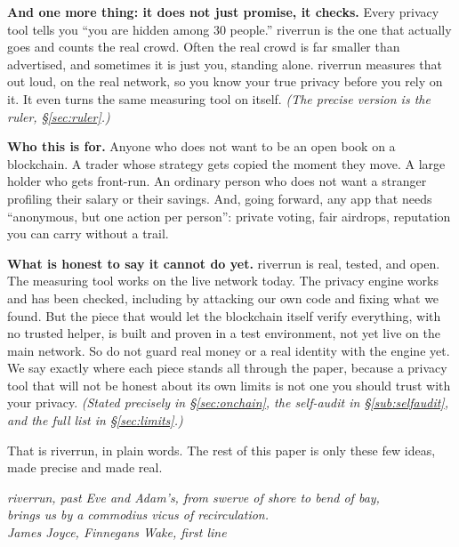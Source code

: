 \documentclass[11pt]{article}
\begin{document}
\vspace{0.3em}
\textbf{And one more thing: it does not just promise, it checks.} Every privacy tool
tells you ``you are hidden among 30 people.'' riverrun is the one that actually goes and
counts the real crowd. Often the real crowd is far smaller than advertised, and sometimes
it is just you, standing alone. riverrun measures that out loud, on the real network, so
you know your true privacy before you rely on it. It even turns the same measuring tool
on itself. \emph{(The precise version is the ruler, \S\ref{sec:ruler}.)}

\vspace{0.3em}
\textbf{Who this is for.} Anyone who does not want to be an open book on a blockchain. A
trader whose strategy gets copied the moment they move. A large holder who gets
front-run. An ordinary person who does not want a stranger profiling their salary or
their savings. And, going forward, any app that needs ``anonymous, but one action per
person'': private voting, fair airdrops, reputation you can carry without a trail.

\vspace{0.3em}
\textbf{What is honest to say it cannot do yet.} riverrun is real, tested, and open. The
measuring tool works on the live network today. The privacy engine works and has been
checked, including by attacking our own code and fixing what we found. But the piece that
would let the blockchain itself verify everything, with no trusted helper, is built and
proven in a test environment, not yet live on the main network. So do not guard real
money or a real identity with the engine yet. We say exactly where each piece stands all
through the paper, because a privacy tool that will not be honest about its own limits is
not one you should trust with your privacy. \emph{(Stated precisely in
\S\ref{sec:onchain}, the self-audit in \S\ref{sub:selfaudit}, and the full list in
\S\ref{sec:limits}.)}

\vspace{0.4em}
That is riverrun, in plain words. The rest of this paper is only these few ideas, made
precise and made real.

\clearpage

\begin{center}
\begin{minipage}{0.80\textwidth}
\centering\itshape\color{ink}
riverrun, past Eve and Adam's, from swerve of shore to bend of bay,\\
brings us by a commodius vicus of recirculation.\\[0.2em]
\normalfont\footnotesize\color{steel} James Joyce, \emph{Finnegans Wake}, first line
\end{minipage}
\end{center}
\vspace{1.2em}
\end{document}
